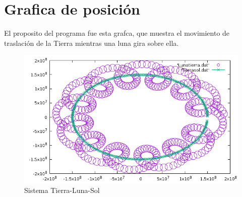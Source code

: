 \documentclass{article}
\begin{document}
\section{Grafica de posición}
El proposito del programa fue esta grafca, que muestra el movimiento de traslación de la Tierra mientras una luna gira sobre ella.
\begin{figure}
  \includegraphics[width=\linewidth]{Sistema.png}
  \caption{Sistema Tierra-Luna-Sol}
\end{figure}
\end{document}
